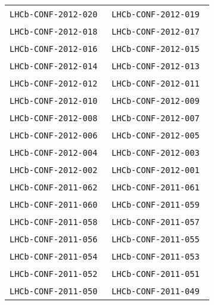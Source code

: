 \begin{center}
\begin{longtable}{ll}
\texttt{LHCb-CONF-2012-020}~\cite{LHCb-CONF-2012-020} & 
\texttt{LHCb-CONF-2012-019}~\cite{LHCb-CONF-2012-019} \\
\texttt{LHCb-CONF-2012-018}~\cite{LHCb-CONF-2012-018} & 
\texttt{LHCb-CONF-2012-017}~\cite{LHCb-CONF-2012-017} \\
\texttt{LHCb-CONF-2012-016}~\cite{LHCb-CONF-2012-016} & 
\texttt{LHCb-CONF-2012-015}~\cite{LHCb-CONF-2012-015} \\
\texttt{LHCb-CONF-2012-014}~\cite{LHCb-CONF-2012-014} & 
\texttt{LHCb-CONF-2012-013}~\cite{LHCb-CONF-2012-013} \\
\texttt{LHCb-CONF-2012-012}~\cite{LHCb-CONF-2012-012} & 
\texttt{LHCb-CONF-2012-011}~\cite{LHCb-CONF-2012-011} \\
\texttt{LHCb-CONF-2012-010}~\cite{LHCb-CONF-2012-010} & 
\texttt{LHCb-CONF-2012-009}~\cite{LHCb-CONF-2012-009} \\
\texttt{LHCb-CONF-2012-008}~\cite{LHCb-CONF-2012-008} & 
\texttt{LHCb-CONF-2012-007}~\cite{LHCb-CONF-2012-007} \\
\texttt{LHCb-CONF-2012-006}~\cite{LHCb-CONF-2012-006} & 
\texttt{LHCb-CONF-2012-005}~\cite{LHCb-CONF-2012-005} \\
\texttt{LHCb-CONF-2012-004}~\cite{LHCb-CONF-2012-004} & 
\texttt{LHCb-CONF-2012-003}~\cite{LHCb-CONF-2012-003} \\
\texttt{LHCb-CONF-2012-002}~\cite{LHCb-CONF-2012-002} & 
\texttt{LHCb-CONF-2012-001}~\cite{LHCb-CONF-2012-001} \\
\hline
\texttt{LHCb-CONF-2011-062}~\cite{LHCb-CONF-2011-062} &
\texttt{LHCb-CONF-2011-061}~\cite{LHCb-CONF-2011-061} \\ 
\texttt{LHCb-CONF-2011-060}~\cite{LHCb-CONF-2011-060} &
\texttt{LHCb-CONF-2011-059}~\cite{LHCb-CONF-2011-059} \\
\texttt{LHCb-CONF-2011-058}~\cite{LHCb-CONF-2011-058} & 
\texttt{LHCb-CONF-2011-057}~\cite{LHCb-CONF-2011-057} \\
\texttt{LHCb-CONF-2011-056}~\cite{LHCb-CONF-2011-056} & 
\texttt{LHCb-CONF-2011-055}~\cite{LHCb-CONF-2011-055} \\ 
\texttt{LHCb-CONF-2011-054}~\cite{LHCb-CONF-2011-054} &
\texttt{LHCb-CONF-2011-053}~\cite{LHCb-CONF-2011-053} \\ 
\texttt{LHCb-CONF-2011-052}~\cite{LHCb-CONF-2011-052} &
\texttt{LHCb-CONF-2011-051}~\cite{LHCb-CONF-2011-051} \\ 
\texttt{LHCb-CONF-2011-050}~\cite{LHCb-CONF-2011-050} &
\texttt{LHCb-CONF-2011-049}~\cite{LHCb-CONF-2011-049} \\

\end{longtable}
\end{center}
